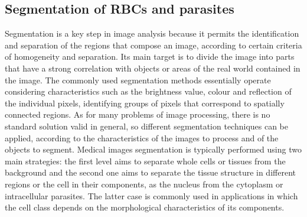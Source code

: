 \documentclass[sensors,review,submit,moreauthors,pdftex,10pt,a4paper]{mdpi}
\begin{document}

\subsection{Segmentation of RBCs and parasites}
Segmentation is a key step in image analysis because it permits the identification and separation of the regions that compose an image, according to certain criteria of homogeneity and separation. Its main target is to divide the image into parts that have a strong correlation with objects or areas of the real world contained in the image.
The commonly used segmentation methods essentially operate considering characteristics such as the brightness value, colour and reflection of the individual pixels, identifying groups of pixels that correspond to spatially connected regions. As for many problems of image processing, there is no standard solution valid in general, so different segmentation techniques can be applied, according to the characteristics of the images to process and of the objects to segment.
Medical images segmentation is typically performed using two main strategies: the first level aims to separate whole cells or tissues from the background and the second one aims to separate the tissue structure in different regions or the cell in their components, as the nucleus from the cytoplasm or intracellular parasites. The latter case is commonly used in applications in which the cell class depends on the morphological characteristics of its components.
\end{document}
